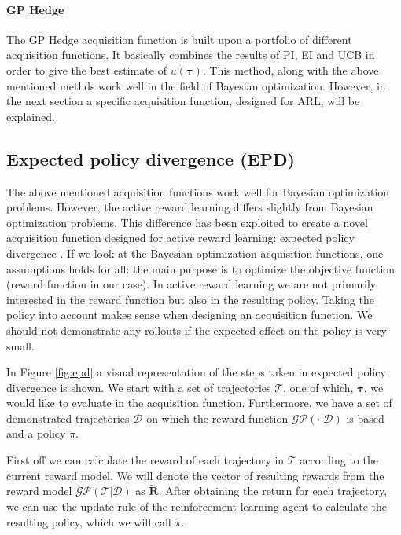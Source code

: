 \documentclass[mscThesis.tex]{subfiles}
\begin{document}
\paragraph{GP Hedge}
The GP Hedge acquisition function is built upon a portfolio of different acquisition functions. It basically combines the results of PI, EI and UCB in order to give the best estimate of $u(\bm{\tau})$. This method, along with the above mentioned methds work well in the field of Bayesian optimization. However, in the next section a specific acquisition function, designed for ARL, will be explained.


\subsection{Expected policy divergence (EPD)}
\label{sec:epd}
The above mentioned acquisition functions work well for Bayesian optimization problems. However, the active reward learning differs slightly from Bayesian optimization problems. This difference has been exploited to create a novel acquisition function designed for active reward learning: expected policy divergence \cite{Daniel2015}. If we look at the Bayesian optimization acquisition functions, one assumptions holds for all: the main purpose is to optimize the objective function (reward function in our case). In active reward learning we are not primarily interested in the reward function but also in the resulting policy. Taking the policy into account makes sense when designing an acquisition function. We should not demonstrate any rollouts if the expected effect on the policy is very small. 

In Figure \ref{fig:epd} a visual representation of the steps taken in expected policy divergence is shown. We start with a set of trajectories $\mathcal{T}$, one of which, $\bm{\tau}$, we would like to evaluate in the acquisition function. Furthermore, we have a set of demonstrated trajectories $\mathcal{D}$ on which the reward function $\mathcal{GP}(\cdot | \mathcal{D})$ is based and a policy $\pi$.

First off we can calculate the reward of each trajectory in $\mathcal{T}$ according to the current reward model. We will denote the vector of resulting rewards from the reward model $\mathcal{GP}(\mathcal{T}|\mathcal{D})$ as $\tilde{\bm{R}}$. After obtaining the return for each trajectory, we can use the update rule of the reinforcement learning agent to calculate the resulting policy, which we will call $\tilde{\pi}$.
\end{document}
